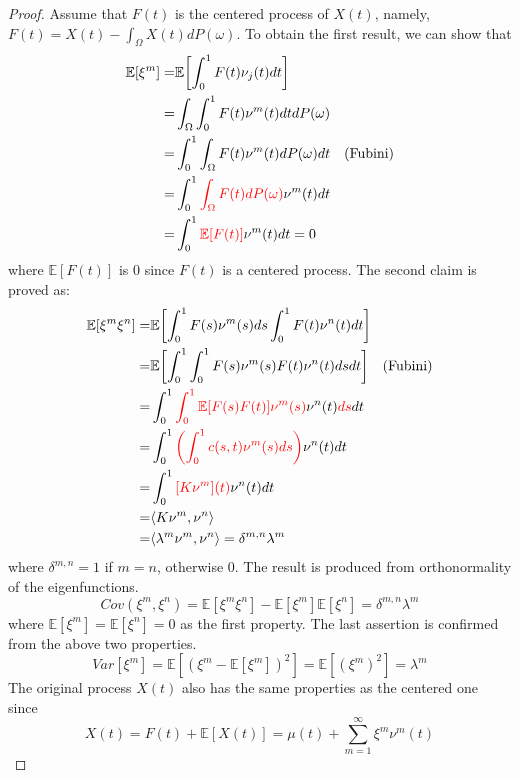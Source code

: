 \documentclass[11pt,twoside,a4paper]{article}
\begin{document}
	\begin{proof}
		Assume that $F(t)$ is the centered process of $X(t)$, namely, $F(t) = X(t) - \int_{\Omega}X(t)dP(\omega)$. To obtain the first result, we can show that
		\begin{equation}\label{Lemma1}
			\begin{split}
				\mathbb{E}[\xi^m] = & \mathbb{E} \biggl\lbrack \int_{0}^{1} F(t) \nu_{j}(t)dt\biggr\rbrack\\
				= & \int_{\Omega} \int_{0}^{1} F(t) \nu^m(t) dt dP(\omega)\\
				= & \int_{0}^{1} \int_{\Omega} F(t) \nu^m(t) dP(\omega) dt \quad \text{(Fubini)}\\
				= & \int_{0}^{1} {\color{red}\int_{\Omega} F(t) dP(\omega)} \nu^m(t) dt\\
				= & \int_{0}^{1} {\color{red}\mathbb{E}[F(t)]} \nu^m(t) dt = 0
			\end{split}
		\end{equation}
		where $\mathbb{E}[F(t)]$ is 0 since $F(t)$ is a centered process.
		The second claim is proved as:
		\begin{equation}\label{Lemma2}
			\begin{split}
				\mathbb{E} [\xi^m \xi^n] = & \mathbb{E}  \biggl\lbrack \int_{0}^{1} F(s) \nu^m(s)ds \int_{0}^{1} F(t) \nu^n(t)dt  \biggr\rbrack\\
				= & \mathbb{E} \biggl\lbrack {\int_{0}^{1} \int_{0}^{1} F(s) \nu^m(s) F(t) \nu^n(t) ds dt} \biggr\rbrack \quad \text{(Fubini)}\\
				= & \int_{0}^{1} {\color{red}\int_{0}^{1} \mathbb{E}[{F(s)F(t)}] \nu^m(s)} \nu^n(t) {\color{red}ds} dt\\
				= & \int_{0}^{1} {\color{red}\left(\int_{0}^{1}c(s,t)\nu^m(s)ds \right)} \nu^n(t) dt \\
				= & \int_{0}^{1}{\color{red}[K\nu^m](t)}\nu^n(t)dt\\
				= & \langle K \nu^m, \nu^n \rangle\\
				= & \langle \lambda^m \nu^m, \nu^n \rangle = \delta^{m,n}\lambda^{m}
			\end{split}
		\end{equation}
		where $\delta^{m,n} = 1$ if $m = n$, otherwise 0. The result is produced from orthonormality of the eigenfunctions.
		\begin{equation}
			Cov\left(\xi^m, \xi^n\right) = \mathbb{E}[\xi^m \xi^n] - \mathbb{E}[\xi^m]\mathbb{E}[\xi^n] = \delta^{m,n}\lambda^{m}
		\end{equation}
		where $\mathbb{E}[\xi^m] = \mathbb{E}[\xi^n] = 0$ as the first property.
		The last assertion is confirmed from the above two properties.
		\begin{equation}\label{Lemma3}
			Var[\xi^m] = \mathbb{E}\left[(\xi^m - \mathbb{E}[\xi^m])^{2}\right] = \mathbb{E}[(\xi^m)^{2}] =\lambda^m
		\end{equation}
		The original process $X(t)$ also has the same properties as the centered one since
		\begin{equation}
			X(t) = F(t) + \mathbb{E}[X(t)] = \mu(t) + \sum_{m=1}^{\infty}\xi^m\nu^m(t)
		\end{equation}
	\end{proof}
	
\end{document}
